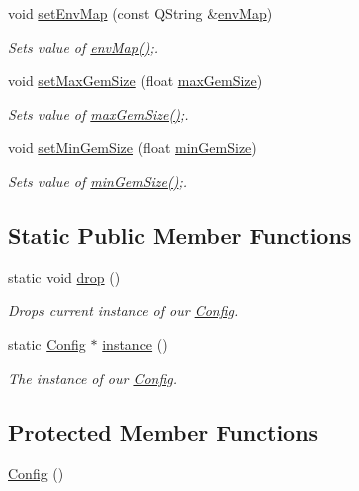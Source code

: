 \begin{DoxyCompactItemize}
void \hyperlink{class_config_a5fd3388c946f7ce1ee6342d6c6b15950}{set\+Env\+Map} (const Q\+String \&\hyperlink{class_config_ae85b2124ed4685d081068c6028081d28}{env\+Map})
\begin{DoxyCompactList}\small\item\em Sets value of \hyperlink{class_config_ae85b2124ed4685d081068c6028081d28}{env\+Map()};. \end{DoxyCompactList}\item 
void \hyperlink{class_config_a4b35695819904d22fc6e01ee3950a4b2}{set\+Max\+Gem\+Size} (float \hyperlink{class_config_a9e631288322234538f08c601202c0dba}{max\+Gem\+Size})
\begin{DoxyCompactList}\small\item\em Sets value of \hyperlink{class_config_a9e631288322234538f08c601202c0dba}{max\+Gem\+Size()};. \end{DoxyCompactList}\item 
void \hyperlink{class_config_a7fa7e53435ece969074029efd14e70e2}{set\+Min\+Gem\+Size} (float \hyperlink{class_config_a26688d51537cbea3ee27810b3f6d1568}{min\+Gem\+Size})
\begin{DoxyCompactList}\small\item\em Sets value of \hyperlink{class_config_a26688d51537cbea3ee27810b3f6d1568}{min\+Gem\+Size()};. \end{DoxyCompactList}\end{DoxyCompactItemize}
\subsection*{Static Public Member Functions}
\begin{DoxyCompactItemize}
\item 
static void \hyperlink{class_config_af99cd0f14331b3df3ed82902728c002c}{drop} ()
\begin{DoxyCompactList}\small\item\em Drops current instance of our \hyperlink{class_config}{Config}. \end{DoxyCompactList}\item 
static \hyperlink{class_config}{Config} $\ast$ \hyperlink{class_config_abf1d4539011ef83cac0fef2ac864a3a9}{instance} ()
\begin{DoxyCompactList}\small\item\em The instance of our \hyperlink{class_config}{Config}. \end{DoxyCompactList}\end{DoxyCompactItemize}
\subsection*{Protected Member Functions}
\begin{DoxyCompactItemize}
\item 
\hyperlink{class_config_abd0c571c116924871e30444b192b792a}{Config} ()
\end{DoxyCompactItemize}
